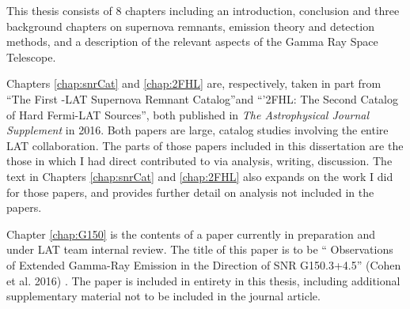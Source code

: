This thesis consists of 8 chapters  including an introduction, conclusion and three background chapters on supernova remnants, \gam{} emission theory and detection methods, and a description of the relevant aspects of the \Fermi{} Gamma Ray Space Telescope.

Chapters \ref{chap:snrCat} and  \ref{chap:2FHL} are, respectively, taken in part from ``The First \Fermi{}-LAT Supernova Remnant Catalog''and ``'2FHL: The Second Catalog of Hard Fermi-LAT Sources'', both published in \emph{The Astrophysical Journal Supplement} in 2016. Both papers are large, catalog studies involving the entire LAT collaboration. The parts of those papers included in this dissertation are the those in which I had direct contributed to via analysis, writing, discussion. The text in Chapters \ref{chap:snrCat} and \ref{chap:2FHL} also expands on the work I did for those papers, and provides further detail on analysis not included in the papers.

Chapter \ref{chap:G150} is the contents of a paper currently in preparation and under LAT team internal review. The title of this paper is to be ``\FermiLat{} Observations of Extended Gamma-Ray Emission in the Direction of SNR G150.3+4.5'' (Cohen et al. 2016) . The paper is included in entirety in this thesis, including additional supplementary material not to be included in the journal article. 


